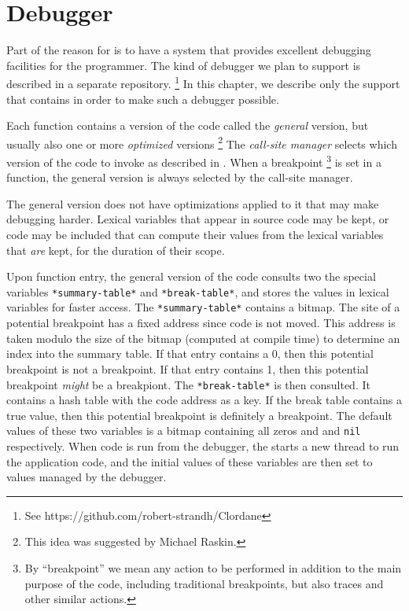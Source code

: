 \chapter{Debugger}
\label{chap-debugger}

Part of the reason for \sysname{} is to have a system that provides
excellent debugging facilities for the programmer.  The kind of
debugger we plan to support is described in a separate repository.%
\footnote{See https://github.com/robert-strandh/Clordane}  In this
chapter, we describe only the support that \sysname{} contains in
order to make such a debugger possible.

Each function contains a version of the code called the \emph{general}
version, but usually also one or more \emph{optimized} versions%
\footnote{This idea was suggested by Michael Raskin.}
The \emph{call-site manager} selects which version of the code to
invoke as described in .  When a
breakpoint%
\footnote{By ``breakpoint'' we mean any action to be performed in
  addition to the main purpose of the code, including traditional
  breakpoints, but also traces and other similar actions.}
is set in a function, the general version is always selected by the
call-site manager.

The general version does not have optimizations applied to it that may
make debugging harder.  Lexical variables that appear in source code
may be kept, or code may be included that can compute their values
from the lexical variables that \emph{are} kept, for the duration of
their scope.

Upon function entry, the general version of the code consults two the
special variables \texttt{*summary-table*} and \texttt{*break-table*},
and stores the values in lexical variables for faster access.  The
\texttt{*summary-table*} contains a bitmap.  The site of a potential
breakpoint has a fixed address since code is not moved.  This address
is taken modulo the size of the bitmap (computed at compile time) to
determine an index into the summary table.  If that entry contains a
0, then this potential breakpoint is not a breakpoint.  If that entry
contains 1, then this potential breakpoint \emph{might} be a
breakpiont.  The \texttt{*break-table*} is then consulted.  It
contains a hash table with the code address as a key.  If the break
table contains a true value, then this potential breakpoint is
definitely a breakpoint.  The default values of these two variables is
a bitmap containing all zeros and and \texttt{nil} respectively.  When
code is run from the debugger, the starts a new thread to run the
application code, and the initial values of these variables are then
set to values managed by the debugger.

